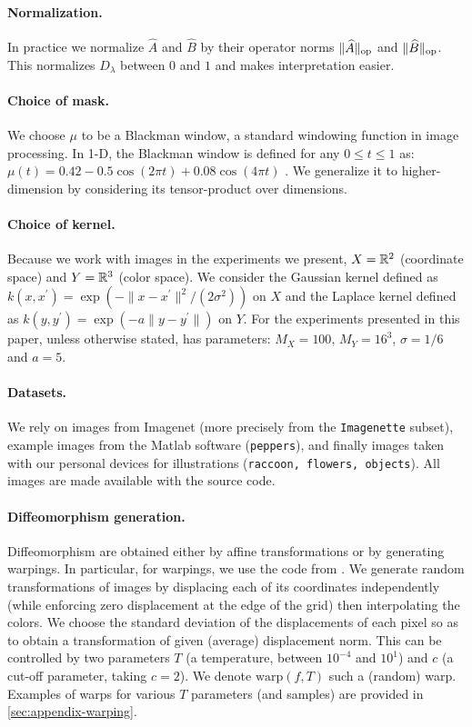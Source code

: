 \paragraph{Normalization.}
In practice we normalize $\widehat A$ and $\widehat B$ by their operator norms $\lVert{\widehat A}\rVert_{\mathrm{op}}$ and $\lVert{\widehat B}\rVert_{\mathrm{op}}$. This normalizes $D_\lambda$ between $0$ and $1$ and makes interpretation easier.

\paragraph{Choice of mask.}
We choose $\mu$ to be a Blackman window, a standard windowing function in image processing. In 1-D, the Blackman window is defined for any $0 \leq t \leq 1$ as:
$\mu(t) = 0.42 - 0.5\cos(2\pi t) + 0.08 \cos(4\pi t)$ \cite{oppenheim99}.
We generalize it to higher-dimension by considering its tensor-product over dimensions.

\paragraph{Choice of kernel.}
Because we work with images in the experiments we present, $X = \mathbb R^2$ (coordinate space) and $Y = \mathbb R^3$ (color space). We consider the Gaussian kernel defined as $k(x, x^\prime) = \exp(- \|x - x^\prime\|^2/(2\sigma^2))$ on $X$ and the Laplace kernel defined as $k(y, y^\prime) = \exp(-a \| y - y^\prime \|)$ on $Y$. For the experiments presented in this paper, unless otherwise stated, \Diffy has parameters: $M_X = 100$, $M_Y = 16^3$, $\sigma = 1/6$ and $a=5$.

\paragraph{Datasets.}
We rely on images from Imagenet (more precisely from the \texttt{Imagenette} subset), example images from the Matlab software (\texttt{peppers}), and finally images taken with our personal devices for illustrations (\texttt{raccoon, flowers, objects}). All images are made available with the source code.

\paragraph{Diffeomorphism generation.} Diffeomorphism are obtained either by affine transformations or by generating warpings. In particular, for warpings, we use the code from \cite{wyartdiffeo}. We generate random transformations of images by displacing each of its coordinates independently (while enforcing zero displacement at the edge of the grid) then interpolating the colors.  We choose the standard deviation of the displacements of each pixel so as to obtain a transformation of given (average) displacement norm. This can be controlled by two parameters $T$ (a temperature, between $10^{-4}$ and $10^1$) and $c$ (a cut-off parameter, taking $c=2$). We denote $\text{warp}(f, T)$ such a (random) warp. Examples of warps for various $T$ parameters (and samples) are provided in \cref{sec:appendix-warping}.

